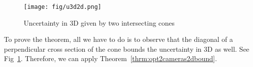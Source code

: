 \begin{figure}[h]
\centering
	\texttt{[image: fig/u3d2d.png]}
	\caption{Uncertainty in 3D given by two intersecting cones }
	\label{fig:u3d2d}
\end{figure} 

To prove the theorem, all we have to do is to observe that the diagonal of a perpendicular cross section of the cone bounds the uncertainty in 3D as well. See Fig~\ref{fig:u3d2d}. Therefore, we can apply Theorem~\ref{thrm:opt2cameras2dbound}.

